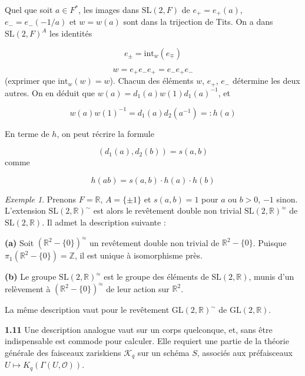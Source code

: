 \documentclass[12pt,a4paper]{article}
\theoremstyle{plain}
\theoremstyle{definition}
\theoremstyle{remark}
\newtheorem{example}[theorem]{Exemple}
\newcommand{\RR}{\mathbb{R}}
\newcommand{\ZZ}{\mathbb{Z}}
\newcommand{\cO}{\mathcal{O}}
\newcommand{\cK}{\mathcal{K}}
\providecommand{\RR}{\mathbb{R}}
\providecommand{\ZZ}{\mathbb{Z}}
\providecommand{\cK}{\mathcal{K}}
\providecommand{\cO}{\mathcal{O}}
\begin{document}
Quel que soit $a \in F^*$, les images dans $\mathrm{SL}(2, F)$ de $e_+ = e_+(a)$, $e_- = e_-(-1/a)$ et $w = w(a)$ sont dans la trijection de Tits. On a dans $\mathrm{SL}(2, F)^A$ les identités

\begin{equation}\label{eq:1.9.1}
e_\pm = \mathrm{int}_w(e_\mp)
\tag{1.9.1}
\end{equation}

\begin{equation}\label{eq:1.9.2}
w = e_+ e_- e_+ = e_- e_+ e_-
\tag{1.9.2}
\end{equation}
(exprimer que $\mathrm{int}_w(w) = w$). Chacun des éléments $w$, $e_+$, $e_-$ détermine les deux autres. On en déduit que $w(a) = d_1(a) w(1) d_1(a)^{-1}$, et

\begin{equation}\label{eq:1.9.3}
w(a) w(1)^{-1} = d_1(a) d_2(a^{-1}) =: h(a)
\tag{1.9.3}
\end{equation}

En terme de $h$, on peut récrire la formule

\begin{equation}\label{eq:1.9.4}
(d_1(a), d_2(b)) = s(a, b)
\tag{1.9.4}
\end{equation}
comme

\begin{equation}\label{eq:1.9.5}
h(ab) = s(a, b) \cdot h(a) \cdot h(b)
\tag{1.9.5}
\end{equation}

\begin{example}
Prenons $F = \RR$, $A = \{\pm 1\}$ et $s(a, b) = 1$ pour $a$ ou $b > 0$, $-1$ sinon. L'extension $\mathrm{SL}(2, \RR)^\sim$ est alors le revêtement double non trivial $\mathrm{SL}(2, \RR)^\approx$ de $\mathrm{SL}(2, \RR)$. Il admet la description suivante :

\textbf{(a)} Soit $(\RR^2 - \{0\})^\approx$ un revêtement double non trivial de $\RR^2 - \{0\}$. Puisque $\pi_1(\RR^2 - \{0\}) = \ZZ$, il est unique à isomorphisme près.

\textbf{(b)} Le groupe $\mathrm{SL}(2, \RR)^\approx$ est le groupe des éléments de $\mathrm{SL}(2, \RR)$, munis d'un relèvement à $(\RR^2 - \{0\})^\approx$ de leur action sur $\RR^2$.

La même description vaut pour le revêtement $\mathrm{GL}(2, \RR)^\sim$ de $\mathrm{GL}(2, \RR)$.
\end{example}

\textbf{1.11} Une description analogue vaut sur un corps quelconque, et, sans être indispensable est commode pour calculer. Elle requiert une partie de la théorie générale des faisceaux zariskiens $\cK_q$ sur un schéma $S$, associés aux préfaisceaux $U \mapsto K_q(\Gamma(U, \cO))$.
\end{document}
